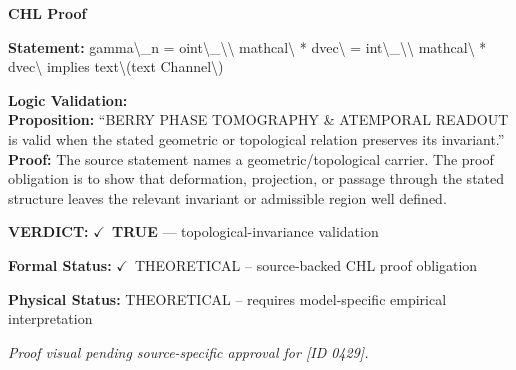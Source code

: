 \vspace{0.45em}
\noindent\textbf{CHL Proof}\par
\textbf{Statement:} gamma\textbackslash{}\_n = oint\textbackslash{}\_\textbackslash{}\textbackslash{} mathcal\textbackslash{} * dvec\textbackslash{} = int\textbackslash{}\_\textbackslash{}\textbackslash{} mathcal\textbackslash{} * dvec\textbackslash{} implies text\textbackslash{}(text
Channel\textbackslash{})

\textbf{Logic Validation:}\\
\textbf{Proposition:} ``BERRY PHASE TOMOGRAPHY \& ATEMPORAL READOUT is valid when the stated geometric or
topological relation preserves its invariant.''\\
\textbf{Proof:} The source statement names a geometric/topological carrier. The proof obligation is to
show that deformation, projection, or passage through the stated structure leaves the
relevant invariant or admissible region well defined.

\textbf{VERDICT:} \ensuremath{\checkmark}\ \textbf{TRUE} --- topological-invariance validation

\textbf{Formal Status:} \ensuremath{\checkmark}\ THEORETICAL -- source-backed CHL proof obligation

\textbf{Physical Status:} THEORETICAL -- requires model-specific empirical interpretation
\par\vspace{0.45em}
\par
\vfill
\begingroup\footnotesize\itshape
Proof visual pending source-specific approval for [ID 0429].
\par\endgroup
\vfill
\endgroup
\endgroup

